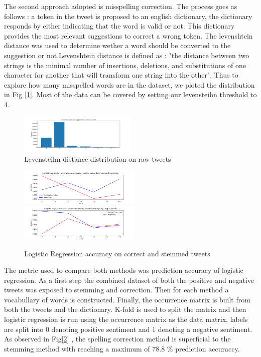 \documentclass[10pt,conference,compsocconf]{IEEEtran}
\begin{document}
The second approach adopted is misspelling correction. The process goes as follows : a token in the tweet is proposed to an english dictionary, the dictionary responds by either indicating that the word is valid or not. This dictionary provides the most relevant suggestions to correct a wrong token. The levenshtein distance was used to determine wether a word should be converted to the suggestion or not.Levenshtein distance is defined as : "the distance between two strings is the minimal number of insertions, deletions, and substitutions of one character for another that will transform one string into the other". Thus to explore how many misspelled words are in the dataset, we ploted the distribution in Fig [\ref{levDistA}]. Most of the data can be covered by setting our levensteihn threshold to 4.
\begin{figure}[!htb]
	\centering \includegraphics[width = 0.5\textwidth]{../plots/distributionA.png}
	\caption{Levensteihn distance distribution on raw tweets}
	\label{levDistA}
\end{figure}

\begin{figure}[!htb]
	\centering \includegraphics[width=220px]{../plots/raw.png}
	\centering \includegraphics[width=220px]{../plots/redundant.png}
	\caption{Logistic Regression accuracy on correct and stemmed tweets}
	\label{raw}
\end{figure}

The metric used to compare both methods was prediction accuracy of logistic regression. As a first step the combined dataset of both the positive and negative tweets was exposed to stemming and correction. Then for each method a vocabullary of words is constructed. Finally, the occurrence matrix is built from both the tweets and the dictionary. K-fold is used to split the matrix and then logistic regression is run using the occurrence matrix as the data matrix, labels are split into 0 denoting positive sentiment and 1 denoting a negative sentiment.  As observed in Fig[\ref{raw}] , the spelling correction method is superficial to the stemming method with reaching a maximum of 78.8 \% prediction accuraccy.
\end{document}
